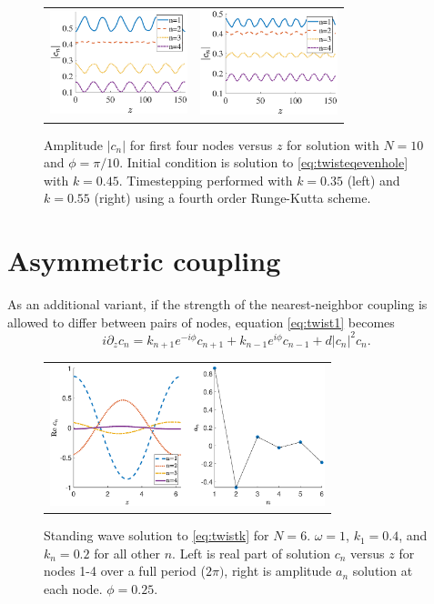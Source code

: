 \documentclass[reprint, amsmath,amssymb,aps]{revtex4-2}
\begin{document}
\begin{figure}
\begin{center}
\begin{tabular}{cc}
\includegraphics[width=4cm]{images/even10pertk45to35} & 
\includegraphics[width=4cm]{images/even10pertk45to55}
\end{tabular}
\end{center}
\caption{Amplitude $|c_n|$ for first four nodes versus $z$ for solution with $N=10$ and $\phi = \pi/10$. Initial condition is solution to \cref{eq:twisteqevenhole} with $k = 0.45$. Timestepping performed with $k = 0.35$ (left) and $k = 0.55$ (right) using a fourth order Runge-Kutta scheme.}
\label{fig:evenholekperturbed}
\end{figure}

\section{Asymmetric coupling}\label{sec:variants}

As an additional variant, if the strength of the nearest-neighbor coupling is allowed to differ between pairs of nodes, equation \cref{eq:twist1} becomes
\begin{equation}\label{eq:twistk}
i \partial_z c_n = k_{n+1} e^{-i\phi}c_{n+1} + k_{n-1} e^{i\phi}c_{n-1} + d |c_n|^2 c_n.
\end{equation}

\begin{figure}
\begin{center}
\begin{tabular}{c}
\includegraphics[width=8cm]{images/even6assym.eps}
\end{tabular}
\end{center}
\caption{Standing wave solution to \cref{eq:twistk} for $N = 6$. $\omega = 1$, $k_1 = 0.4$, and $k_n = 0.2$ for all other $n$. Left is real part of solution $c_n$ versus $z$ for nodes 1-4 over a full period ($2 \pi)$, right is amplitude $a_n$ solution at each node. $\phi = 0.25$.}
\label{fig:even6assym}
\end{figure}
\end{document}
